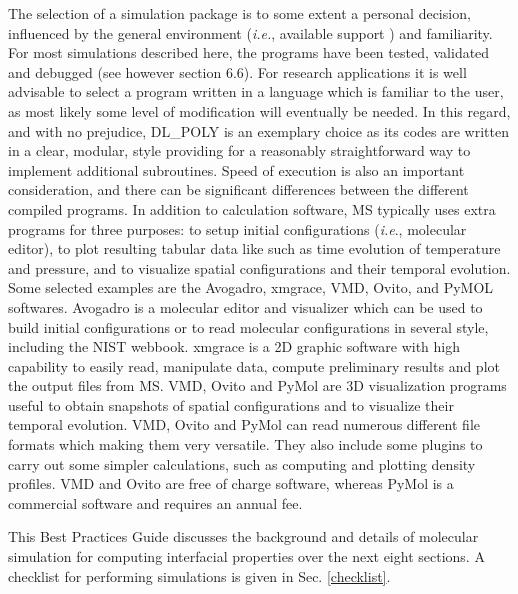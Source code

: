 \documentclass[9pt,bestpractices]{livecoms}
\begin{document}
The selection of a simulation package is to some extent a personal decision,
influenced by the general environment (\textit{i.e.}, available support ) and
familiarity. For most simulations described here, the programs have been
tested, validated and debugged (see however section 6.6). For research
applications it is well advisable to select a program written in a language
which is familiar to the user, as most likely some level of modification will eventually
be needed. In this regard, and with no prejudice, DL\_POLY is an exemplary
choice as its codes are written in a clear, modular, style providing for
a reasonably straightforward way to implement additional subroutines. Speed of
execution is also an important consideration, and there can be significant
differences between the different compiled programs. In addition to calculation
software, MS typically uses extra programs for three purposes: to setup initial configurations
(\textit{i.e}., molecular editor), to plot resulting tabular data like such as 
time evolution of temperature and pressure, and to visualize 
spatial configurations and their temporal evolution. Some selected examples are
the Avogadro\citep{avogadro}, xmgrace\citep{xmgrace},
VMD\citep{VMD}, Ovito\citep{ovito}, and PyMOL\citep{pymol} softwares.
Avogadro is a molecular editor and visualizer which can
be used to build initial configurations or to read molecular configurations in
several style, including the NIST webbook\citep{lemmon2013}. xmgrace is a 2D graphic software with high capability to
easily read, manipulate data, compute preliminary results and plot the output
files from MS. VMD, Ovito and PyMol are 3D visualization programs useful to
obtain snapshots of spatial configurations and to visualize their temporal
evolution. VMD, Ovito and PyMol can read numerous different file formats which
making them very versatile. They also include some plugins to
carry out some simpler calculations, such as computing and plotting density profiles. VMD and Ovito
are free of charge software, whereas PyMol is a commercial software and
requires an annual fee.

This Best Practices Guide discusses the background and details of molecular simulation for computing interfacial properties over the next eight sections. A checklist for performing simulations is given in Sec. \ref{checklist}.

\end{document}
